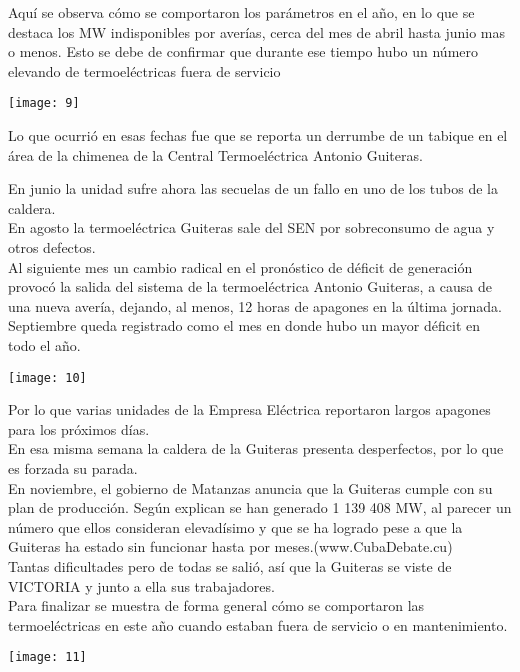 \documentclass{article}
\begin{document}
\vspace{1cm}

Aquí se observa cómo se comportaron los parámetros en el año, en lo que se destaca los MW indisponibles por averías, cerca del mes de abril hasta junio mas o menos. Esto se debe de confirmar que durante ese tiempo hubo un número elevando de termoeléctricas fuera de servicio\\

\vspace{0.5cm}
\begin{center}
   \texttt{[image: 9]}\\ 
\end{center}

\vspace{0.5cm}

Lo que ocurrió en esas fechas fue que se reporta un derrumbe de un tabique en el área de la chimenea de la Central Termoeléctrica Antonio Guiteras.\\

\vspace{0.5cm}

En junio la unidad sufre ahora las secuelas de un fallo en uno de los tubos de la caldera.\\
En agosto la termoeléctrica Guiteras sale del SEN por sobreconsumo de agua y otros defectos.\\
Al siguiente mes un cambio radical en el pronóstico de déficit de generación provocó la salida del sistema de la termoeléctrica Antonio Guiteras, a causa de una nueva avería, dejando, al menos, 12 horas de apagones en la última jornada. Septiembre queda registrado como el mes en donde hubo un mayor déficit en todo el año.\\

\vspace{0.5cm}
\begin{center}
    \texttt{[image: 10]}
\end{center}

\vspace{0.5cm}

Por lo que varias unidades de la Empresa Eléctrica reportaron largos apagones para los próximos días.\\
En esa misma semana la caldera de la Guiteras presenta desperfectos, por lo que es forzada su parada. \\
En noviembre, el gobierno de Matanzas anuncia que la Guiteras cumple con su plan de producción. Según explican se han generado 1 139 408 MW, al parecer un número que ellos consideran elevadísimo y que se ha logrado pese a que la Guiteras ha estado sin funcionar hasta por meses.(www.CubaDebate.cu)\\
Tantas dificultades pero de todas se salió, así que la Guiteras se viste de VICTORIA y junto a ella sus trabajadores.\\
Para finalizar se muestra de forma general cómo se comportaron las termoeléctricas en este año cuando estaban fuera de servicio o en mantenimiento.\\

\vspace{0.5cm}
\begin{center}
    \texttt{[image: 11]}
\end{center}
\end{document}
